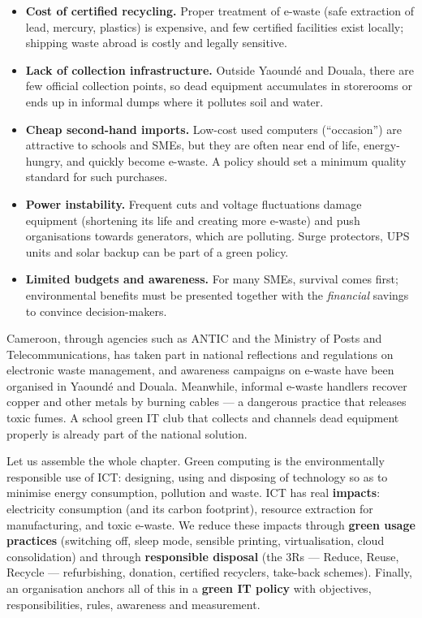 \documentclass[11pt]{article}
\newcommand{\cle}[1]{{\popxbold\color{popdark}#1}}
\newcounter{popsec}
\newcounter{popsub}
\newcommand{\courssub}[1]{%
  \stepcounter{popsub}%
  \par\vspace{9pt}\noindent{\popxbold\fontsize{11.5}{13}\selectfont\color{popink}{\color{poporange}\thepopsec.\thepopsub}\hspace{6pt}#1}\par\nopagebreak\vspace{4pt}
}
\begin{document}
\begin{itemize}
\item \textbf{Cost of certified recycling.} Proper treatment of e-waste (safe extraction of lead, mercury, plastics) is expensive, and few certified facilities exist locally; shipping waste abroad is costly and legally sensitive.
\item \textbf{Lack of collection infrastructure.} Outside Yaoundé and Douala, there are few official collection points, so dead equipment accumulates in storerooms or ends up in informal dumps where it pollutes soil and water.
\item \textbf{Cheap second-hand imports.} Low-cost used computers (``occasion'') are attractive to schools and SMEs, but they are often near end of life, energy-hungry, and quickly become e-waste. A policy should set a minimum quality standard for such purchases.
\item \textbf{Power instability.} Frequent cuts and voltage fluctuations damage equipment (shortening its life and creating more e-waste) and push organisations towards generators, which are polluting. Surge protectors, UPS units and solar backup can be part of a green policy.
\item \textbf{Limited budgets and awareness.} For many SMEs, survival comes first; environmental benefits must be presented together with the \emph{financial} savings to convince decision-makers.
\end{itemize}

\begin{savaistu}
Cameroon, through agencies such as ANTIC and the Ministry of Posts and Telecommunications, has taken part in national reflections and regulations on electronic waste management, and awareness campaigns on e-waste have been organised in Yaoundé and Douala. Meanwhile, informal e-waste handlers recover copper and other metals by burning cables — a dangerous practice that releases toxic fumes. A school green IT club that collects and channels dead equipment properly is already part of the national solution.
\end{savaistu}

\courssub{Chapter Synthesis: From Definition to Policy}

Let us assemble the whole chapter. \cle{Green computing} is the environmentally responsible use of ICT: designing, using and disposing of technology so as to minimise energy consumption, pollution and waste. ICT has real \textbf{impacts}: electricity consumption (and its carbon footprint), resource extraction for manufacturing, and toxic e-waste. We reduce these impacts through \textbf{green usage practices} (switching off, sleep mode, sensible printing, virtualisation, cloud consolidation) and through \textbf{responsible disposal} (the 3Rs — Reduce, Reuse, Recycle — refurbishing, donation, certified recyclers, take-back schemes). Finally, an organisation anchors all of this in a \textbf{green IT policy} with objectives, responsibilities, rules, awareness and measurement.
\end{document}
